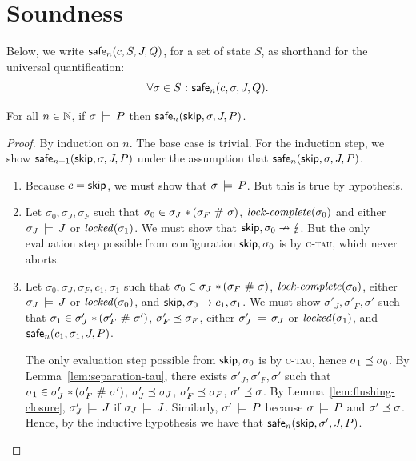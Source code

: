 \documentclass[11pt]{report}
\begin{document}
\section{Soundness}
\label{sec:soundness-proofs}
Below, we write $\mathsf{safe}_{n}(c,S,J,Q)$, for a set of state $S$, as shorthand for the universal quantification: \[ \forall \sigma \in S \operatorname{\,:\,} \mathsf{safe}_{n}(c,\sigma,J,Q).\]

\begin{lemma}
	\label{lem:skip-safe}
	For all $n \in \mathbb{N}$, if $\sigma \,\models\, P$ then $\mathsf{safe}_{n}(\operatorname{\mathsf{skip}},\sigma,J,P)$. 
\end{lemma}

\begin{proof}
	By induction on $n$. The base case is trivial. For the induction step, we show $\mathsf{safe}_{n+1}(\operatorname{\mathsf{skip}},\sigma,J,P)$ under the assumption that $\mathsf{safe}_{n}(\operatorname{\mathsf{skip}},\sigma,J,P)$. 
	\begin{enumerate}
		\item Because $c = \operatorname{\mathsf{skip}}$, we must show that $\sigma \,\models\, P$. But this is true by hypothesis. 

		\item Let $\sigma_0,\sigma_J,\sigma_F$ such that $\sigma_0 \in \sigma_J \operatorname{\,\ast\,} (\sigma_F \operatorname{\,\#\,} \sigma)$, $\text{\textit{lock-complete}}(\sigma_0)$ and either $\sigma_J \,\models\, J$ or $\mathit{locked}(\sigma_1)$. We must show that $\operatorname{\mathsf{skip}},\sigma_0 \nrightarrow \lightning$. But the only evaluation step possible from configuration $\operatorname{\mathsf{skip}},\sigma_0$ is by \textsc{c-tau}, which never aborts. 

		\item Let $\sigma_0,\sigma_J,\sigma_F,c_1,\sigma_1$ such that $\sigma_0 \in \sigma_J \operatorname{\,\ast\,} (\sigma_F \operatorname{\,\#\,} \sigma)$, $\text{\textit{lock-complete}}(\sigma_0)$, either $\sigma_J \,\models\, J$ or $\mathit{locked}(\sigma_0)$, and $\operatorname{\mathsf{skip}},\sigma_0 \rightarrow c_1,\sigma_1$. We must show $\sigma'_J,\sigma'_F,\sigma'$ such that $\sigma_1 \in \sigma'_J \operatorname{\,\ast\,} (\sigma'_F \operatorname{\,\#\,} \sigma')$, $\sigma'_F \preceq \sigma_F$, either $\sigma'_J \,\models\, \sigma_J$ or $\mathit{locked}(\sigma_1)$, and $\mathsf{safe}_{n}(c_1,\sigma_1,J,P)$.

		The only evaluation step possible from $\operatorname{\mathsf{skip}},\sigma_0$ is by \textsc{c-tau}, hence $\sigma_1 \preceq \sigma_0$. By Lemma~\ref{lem:separation-tau}, there exists $\sigma'_J,\sigma'_F,\sigma'$ such that $\sigma_1 \in \sigma'_J \operatorname{\,\ast\,} (\sigma'_F \operatorname{\,\#\,} \sigma')$, $\sigma'_J \preceq \sigma_J$, $\sigma'_F \preceq \sigma_F$, $\sigma' \preceq \sigma$. By Lemma~\ref{lem:flushing-closure}, $\sigma'_J \,\models\, J$ if $\sigma_J \,\models\, J$. Similarly, $\sigma' \,\models\, P$ because $\sigma \,\models\, P$ and $\sigma' \preceq \sigma$. Hence, by the inductive hypothesis we have that $\mathsf{safe}_{n}(\operatorname{\mathsf{skip}},\sigma',J,P)$. 
	\end{enumerate}
\end{proof}
\end{document}
